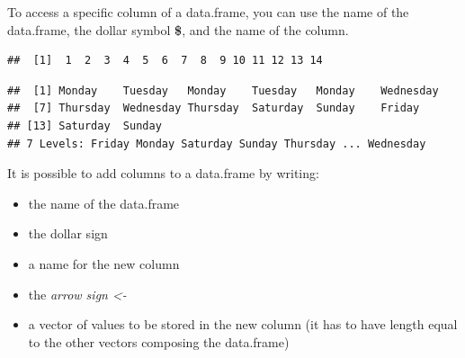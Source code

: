 \documentclass[
]{article}
\newenvironment{Shaded}{\begin{snugshade}}{\end{snugshade}}
\newcommand{\DecValTok}[1]{\textcolor[rgb]{0.00,0.00,0.81}{#1}}
\newcommand{\KeywordTok}[1]{\textcolor[rgb]{0.13,0.29,0.53}{\textbf{#1}}}
\newcommand{\NormalTok}[1]{#1}
\newcommand{\OperatorTok}[1]{\textcolor[rgb]{0.81,0.36,0.00}{\textbf{#1}}}
\newcommand{\StringTok}[1]{\textcolor[rgb]{0.31,0.60,0.02}{#1}}
\providecommand{\tightlist}{%
  \setlength{\itemsep}{0pt}\setlength{\parskip}{0pt}}
\begin{document}
To access a specific column of a data.frame, you can use the name of the data.frame, the dollar symbol \textbf{\$}, and the name of the column.

\begin{Shaded}
\end{Shaded}

\begin{verbatim}
##  [1]  1  2  3  4  5  6  7  8  9 10 11 12 13 14
\end{verbatim}

\begin{Shaded}
\end{Shaded}

\begin{verbatim}
##  [1] Monday    Tuesday   Monday    Tuesday   Monday    Wednesday
##  [7] Thursday  Wednesday Thursday  Saturday  Sunday    Friday   
## [13] Saturday  Sunday   
## 7 Levels: Friday Monday Saturday Sunday Thursday ... Wednesday
\end{verbatim}

It is possible to add columns to a data.frame by writing:

\begin{itemize}
\tightlist
\item
  the name of the data.frame
\item
  the dollar sign
\item
  a name for the new column
\item
  the \emph{arrow sign \textless-}
\item
  a vector of values to be stored in the new column (it has to have length equal to the other vectors composing the data.frame)
\end{itemize}

\begin{Shaded}
\end{Shaded}
\end{document}
